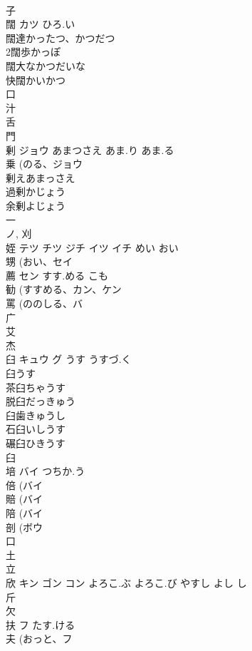 \documentclass[8pt]{extreport}
\begin{document}
\begin{CJK}{UTF8}{min}
\\	子 
\\	闊	カツ	ひろ.い	
\\	闊達かったつ、かつだつ
\\	2闊歩かっぽ
\\	闊大なかつだいな
\\	快闊かいかつ
\\	口 
\\	汁 
\\	舌 
\\	門 
\\	剰	ジョウ	あまつさえ あま.り あま.る	
\\	乗 (のる、ジョウ 
\\	剰えあまっさえ
\\	過剰かじょう
\\	余剰よじょう
\\	一 
\\	ノ, 刈 
\\	姪	テツ チツ ジチ イツ イチ	めい おい	
\\	甥 (おい、セイ 
\\	薦	セン	すす.める こも	
\\	勧 (すすめる、カン、ケン 
\\	罵 (ののしる、バ 
\\	广 
\\	艾 
\\	杰	
\\	臼	キュウ グ	うす うすづ.く	
\\	臼うす 
\\	茶臼ちゃうす 
\\	脱臼だっきゅう 
\\	臼歯きゅうし 
\\	石臼いしうす 
\\	碾臼ひきうす 
\\	臼 
\\	培	バイ	つちか.う	
\\	倍 (バイ 
\\	賠 (バイ 
\\	陪 (バイ 
\\	剖 (ボウ 
\\	口 
\\	土 
\\	立 
\\	欣	キン ゴン コン	よろこ.ぶ よろこ.び やすし よし し	
\\	斤 
\\	欠 
\\	扶	フ	たす.ける	
\\	夫 (おっと、フ 

\end{CJK}
\end{document}
